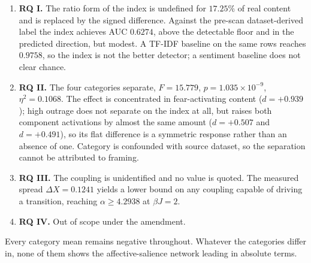 \begin{enumerate}
\item \textbf{RQ I.} The ratio form of the index is undefined for $17.25\%$ of real content
and is replaced by the signed difference. Against the pre-scan dataset-derived label the index achieves
AUC $0.6274$, above the detectable floor and in the predicted direction, but modest. A TF-IDF
baseline on the same rows reaches $0.9758$, so the index is not the better detector; a
sentiment baseline does not clear chance.

\item \textbf{RQ II.} The four categories separate, $F = 15.779$, $p = 1.035 \times 10^{-9}$,
$\eta^2 = 0.1068$. The effect is concentrated in fear-activating content
($d = +0.939$); high outrage does not separate on the index at all, but raises both component
activations by almost the same amount ($d = +0.507$ and $d = +0.491$), so its flat difference is a
symmetric response rather than an absence of one. Category is confounded with source dataset,
so the separation cannot be attributed to framing.

\item \textbf{RQ III.} The coupling is unidentified and no value is quoted. The measured
spread $\Delta X = 0.1241$ yields a lower bound on any coupling capable of driving a
transition, reaching $\alpha \ge 4.2938$ at $\beta J = 2$.

\item \textbf{RQ IV.} Out of scope under the amendment.
\end{enumerate}

Every category mean remains negative throughout. Whatever the categories differ in, none of
them shows the affective-salience network leading in absolute terms.
